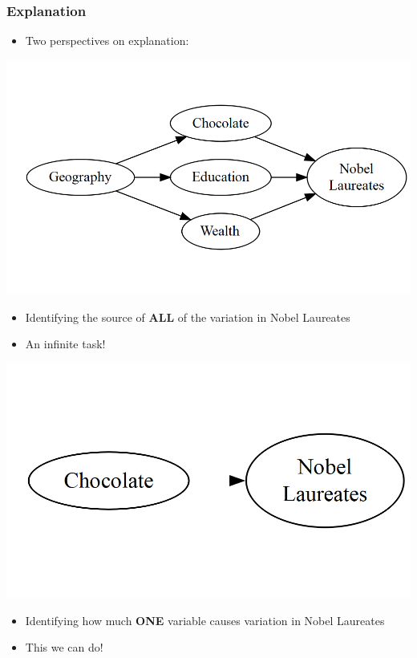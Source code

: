 \documentclass[xcolor=x11names,compress]{beamer}\usepackage[]{graphicx}\usepackage[]{color}
\makeatletter
\def\maxwidth{ %
  \ifdim\Gin@nat@width>\linewidth
    \linewidth
  \else
    \Gin@nat@width
  \fi
}
\newenvironment{knitrout}{}{} %
\renewcommand{\(}{\begin{columns}}
\renewcommand{\)}{\end{columns}}
\newcommand{\<}[1]{\begin{column}{#1}}
\renewcommand{\>}{\end{column}}
\makeatother
\begin{document}
\begin{frame}
\frametitle{Explanation}
\begin{itemize}
\item Two perspectives on explanation:
\end{itemize}
\begin{multicols}{2}
\begin{knitrout}
\color{fgcolor}
\includegraphics[width=\maxwidth]{figure/explanation1c-1} 

\end{knitrout}
\begin{itemize}
\item Identifying the source of \textbf{ALL} of the variation in Nobel Laureates
\item An infinite task!
\end{itemize}
\columnbreak
\begin{knitrout}
\color{fgcolor}
\includegraphics[width=\maxwidth]{figure/explanation2c-1} 

\end{knitrout}
\begin{itemize}
\item Identifying how much \textbf{ONE} variable causes variation in Nobel Laureates
\item This we can do!
\end{itemize}
\end{multicols}
\end{frame}
\end{document}
